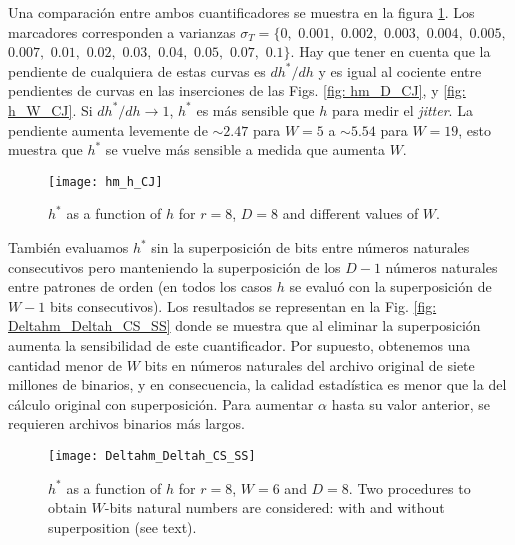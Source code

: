 
Una comparación entre ambos cuantificadores se muestra en la figura \ref{fig:hm_h_CJ}.
Los marcadores corresponden a varianzas $\sigma_T=\{0,$ $0.001,$ $0.002,$ $0.003,$ $0.004,$ $0.005,$ $0.007,$ $0.01,$ $0.02,$ $0.03,$ $0.04,$ $0.05,$ $0.07,$ $0.1\}$.
Hay que tener en cuenta que la pendiente de cualquiera de estas curvas es $dh^*/dh$ y es igual al cociente entre pendientes de curvas en las inserciones de las Figs. \ref{fig: hm_D_CJ}, y \ref{fig: h_W_CJ}.
Si $dh^*/dh\to1$, $h^*$ es más sensible que $h$ para medir el \textit{jitter}.
La pendiente aumenta levemente de $\sim2.47$ para $W =5 $ a $\sim5.54$ para $W = 19$, esto muestra que $h^*$ se vuelve más sensible a medida que aumenta $W$.
	
\begin{figure}
\center
\texttt{[image: hm\_h\_CJ]}
\caption{$h^*$ as a function of $h$ for $r=8$, $D=8$ and different values of $W$.}
\label{fig:hm_h_CJ}
\end{figure}

También evaluamos $h^*$ sin la superposición de bits entre números naturales consecutivos pero manteniendo la superposición de los $D-1$ números naturales entre patrones de orden (en todos los casos $h$ se evaluó con la superposición de $W-1$ bits consecutivos).
Los resultados se representan en la Fig. \ref{fig: Deltahm_Deltah_CS_SS} donde se muestra que al eliminar la superposición aumenta la sensibilidad de este cuantificador.
Por supuesto, obtenemos una cantidad menor de $W$ bits en números naturales del archivo original de siete millones de binarios, y en consecuencia, la calidad estadística es menor que la del cálculo original con superposición.
Para aumentar $\alpha$ hasta su valor anterior, se requieren archivos binarios más largos.

\begin{figure}
\center
\texttt{[image: Deltahm\_Deltah\_CS\_SS]}
\caption{$h^*$ as a function of $h$ for $r=8$, $W=6$ and $D=8$. Two procedures to obtain $W$-bits natural numbers are considered: with and without superposition (see text).}
\label{fig:Deltahm_Deltah_CS_SS}
\end{figure}